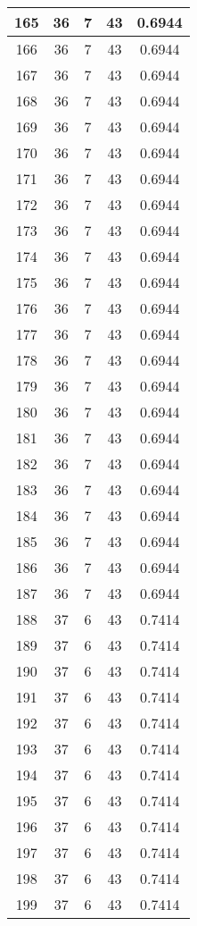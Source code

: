 \documentclass[letterpaper, 12pt]{article}
\begin{document}
\begin{longtable}{|c|c|c|c|c|}
\hline
165 & 36 & 7 & 43 & 0.6944 \\
\hline
166 & 36 & 7 & 43 & 0.6944 \\
\hline
167 & 36 & 7 & 43 & 0.6944 \\
\hline
168 & 36 & 7 & 43 & 0.6944 \\
\hline
169 & 36 & 7 & 43 & 0.6944 \\
\hline
170 & 36 & 7 & 43 & 0.6944 \\
\hline
171 & 36 & 7 & 43 & 0.6944 \\
\hline
172 & 36 & 7 & 43 & 0.6944 \\
\hline
173 & 36 & 7 & 43 & 0.6944 \\
\hline
174 & 36 & 7 & 43 & 0.6944 \\
\hline
175 & 36 & 7 & 43 & 0.6944 \\
\hline
176 & 36 & 7 & 43 & 0.6944 \\
\hline
177 & 36 & 7 & 43 & 0.6944 \\
\hline
178 & 36 & 7 & 43 & 0.6944 \\
\hline
179 & 36 & 7 & 43 & 0.6944 \\
\hline
180 & 36 & 7 & 43 & 0.6944 \\
\hline
181 & 36 & 7 & 43 & 0.6944 \\
\hline
182 & 36 & 7 & 43 & 0.6944 \\
\hline
183 & 36 & 7 & 43 & 0.6944 \\
\hline
184 & 36 & 7 & 43 & 0.6944 \\
\hline
185 & 36 & 7 & 43 & 0.6944 \\
\hline
186 & 36 & 7 & 43 & 0.6944 \\
\hline
187 & 36 & 7 & 43 & 0.6944 \\
\hline
188 & 37 & 6 & 43 & 0.7414 \\
\hline
189 & 37 & 6 & 43 & 0.7414 \\
\hline
190 & 37 & 6 & 43 & 0.7414 \\
\hline
191 & 37 & 6 & 43 & 0.7414 \\
\hline
192 & 37 & 6 & 43 & 0.7414 \\
\hline
193 & 37 & 6 & 43 & 0.7414 \\
\hline
194 & 37 & 6 & 43 & 0.7414 \\
\hline
195 & 37 & 6 & 43 & 0.7414 \\
\hline
196 & 37 & 6 & 43 & 0.7414 \\
\hline
197 & 37 & 6 & 43 & 0.7414 \\
\hline
198 & 37 & 6 & 43 & 0.7414 \\
\hline
199 & 37 & 6 & 43 & 0.7414 \\
\hline
\end{longtable}
\end{document}
